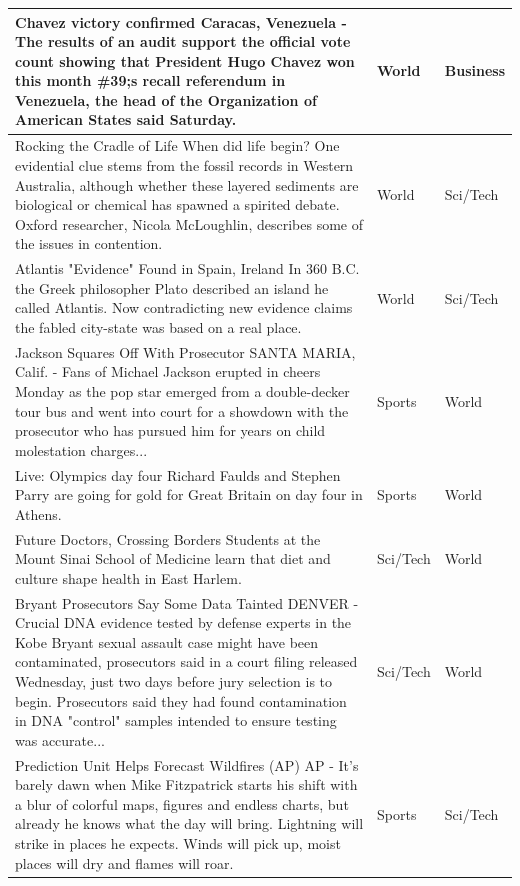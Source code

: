 \documentclass[12pt,a4paper,english]{article}
\begin{document}
\begin{longtable}{| m{25em} | m{5em} | m{5em} |}
        Chavez victory confirmed Caracas, Venezuela - The results of an audit support the official vote count showing that President Hugo Chavez won this month \#39;s recall referendum in Venezuela, the head of the Organization of American States said Saturday. & World & Business \\ \hline
        
        Rocking the Cradle of Life When did life begin? One evidential clue stems from the fossil records in Western Australia, although whether these layered sediments are biological or chemical has spawned a spirited debate. Oxford researcher, Nicola McLoughlin, describes some of the issues in contention. & World & Sci/Tech \\ \hline
        
        Atlantis "Evidence" Found in Spain, Ireland In 360 B.C. the Greek philosopher Plato described an island he called Atlantis. Now contradicting new evidence claims the fabled city-state was based on a real place. & World & Sci/Tech \\ \hline
        
        Jackson Squares Off With Prosecutor SANTA MARIA, Calif. - Fans of Michael Jackson erupted in cheers Monday as the pop star emerged from a double-decker tour bus and went into court for a showdown with the prosecutor who has pursued him for years on child molestation charges... & Sports & World \\ \hline
        
        Live: Olympics day four Richard Faulds and Stephen Parry are going for gold for Great Britain on day four in Athens. & Sports & World \\ \hline
        
        Future Doctors, Crossing Borders Students at the Mount Sinai School of Medicine learn that diet and culture shape health in East Harlem. & Sci/Tech & World \\ \hline
        
        Bryant Prosecutors Say Some Data Tainted DENVER - Crucial DNA evidence tested by defense experts in the Kobe Bryant sexual assault case might have been contaminated, prosecutors said in a court filing released Wednesday, just two days before jury selection is to begin. Prosecutors said they had found contamination in DNA "control" samples intended to ensure testing was accurate... & Sci/Tech & World \\ \hline
        
        Prediction Unit Helps Forecast Wildfires (AP) AP - It's barely dawn when Mike Fitzpatrick starts his shift with a blur of colorful maps, figures and endless charts, but already he knows what the day will bring. Lightning will strike in places he expects. Winds will pick up, moist places will dry and flames will roar. & Sports & Sci/Tech \\ \hline
        

\end{longtable}
\end{document}
